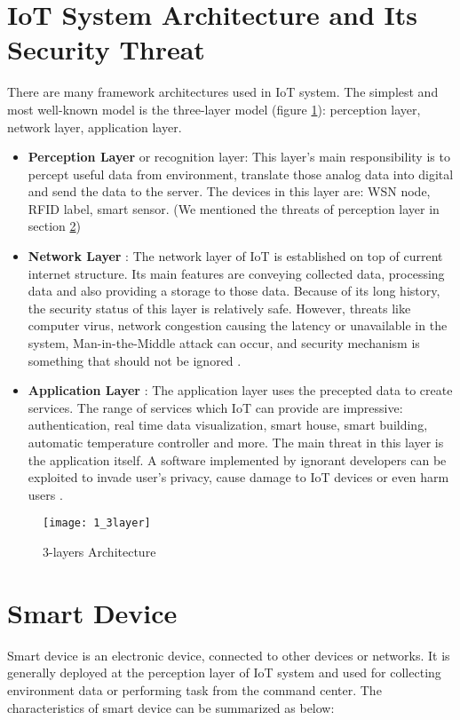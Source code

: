 \section{IoT System Architecture and Its Security Threat}
There are many framework architectures used in IoT system. The simplest and most well-known model is the three-layer model (figure \ref{fig:s2_3layer}): perception layer, network layer, application layer.  

\begin{itemize}
    \item \textbf{Perception Layer} or recognition layer: This layer’s main responsibility is to percept useful data from environment, translate those analog data into digital and send the data to the server.  The devices in this layer are: WSN node, RFID label, smart sensor. (We mentioned the threats of perception layer in section \ref{S2:SMARTDEVICE})
    \item \textbf{Network Layer} : The network layer of IoT is established on top of current internet structure. Its main features are conveying collected data, processing data and also providing a storage to those data. Because of its long history, the security status of this layer is relatively safe. However, threats like computer virus, network congestion causing the latency or unavailable in the system, Man-in-the-Middle attack can occur, and security mechanism is something that should not be ignored \parencite{STAGE:6188257}.
    \item \textbf{Application Layer} : The application layer uses the precepted data to create services. The range of services which IoT can provide are impressive: authentication, real time data visualization, smart house, smart building, automatic temperature controller and more. The main threat in this layer is the application itself. A software implemented by ignorant developers can be exploited to invade user’s privacy, cause damage to IoT devices or even harm users \parencite{STAGE:6188257}.
\end{itemize}

\begin{figure}
    \centering
    \texttt{[image: 1\_3layer]}
    \caption{3-layers Architecture}
    \label{fig:s2_3layer} 
\end{figure}

\section{Smart Device}
\label{S2:SMARTDEVICE}
Smart device is an electronic device, connected to other devices or networks. It is generally deployed at the perception layer of IoT system and used for collecting environment data or performing task from the command center. The characteristics of smart device can be summarized as below: 

